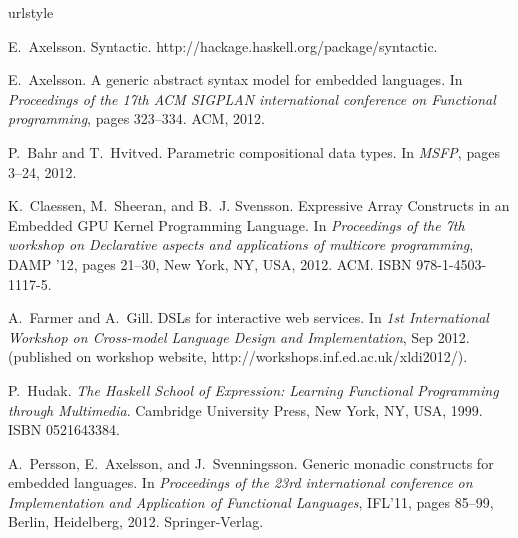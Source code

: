 \documentclass{sigplanconf}
\begin{document}




\begin{thebibliography}{9}
\providecommand{\natexlab}[1]{#1}
\providecommand{\url}[1]{\texttt{#1}}
\expandafter\ifx\csname urlstyle\endcsname\relax
  \providecommand{\doi}[1]{doi: #1}\else
  \providecommand{\doi}{doi: \begingroup \urlstyle{rm}\Url}\fi

E.~Axelsson.
\newblock Syntactic.
\newblock http://hackage.haskell.org/package/syntactic.

E.~Axelsson.
\newblock A generic abstract syntax model for embedded languages.
\newblock In \emph{Proceedings of the 17th ACM SIGPLAN international conference
  on Functional programming}, pages 323--334. ACM, 2012.

P.~Bahr and T.~Hvitved.
\newblock Parametric compositional data types.
\newblock In \emph{MSFP}, pages 3--24, 2012.

K.~Claessen, M.~Sheeran, and B.~J. Svensson.
\newblock Expressive {A}rray {C}onstructs in an {E}mbedded {GPU} {K}ernel
  {P}rogramming {L}anguage.
\newblock In \emph{Proceedings of the 7th workshop on Declarative aspects and
  applications of multicore programming}, DAMP '12, pages 21--30, New York, NY,
  USA, 2012. ACM.
\newblock ISBN 978-1-4503-1117-5.

A.~Farmer and A.~Gill.
 {DSL}s for interactive web services.
\newblock In \emph{1st International Workshop on Cross-model Language Design
  and Implementation}, Sep 2012.
\newblock (published on workshop website,
  http://workshops.inf.ed.ac.uk/xldi2012/).

P.~Hudak.
\newblock \emph{The Haskell School of Expression: Learning Functional
  Programming through Multimedia}.
\newblock Cambridge University Press, New York, NY, USA, 1999.
\newblock ISBN 0521643384.

A.~Persson, E.~Axelsson, and J.~Svenningsson.
\newblock Generic monadic constructs for embedded languages.
\newblock In \emph{Proceedings of the 23rd international conference on
  Implementation and Application of Functional Languages}, IFL'11, pages
  85--99, Berlin, Heidelberg, 2012. Springer-Verlag.


\end{thebibliography}
\end{document}
